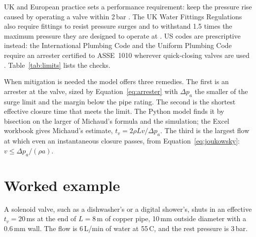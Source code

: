 \documentclass[a4paper,justified,nobib]{tufte-handout}
\newcommand{\degC}{\,\textdegree{}C}
\newcommand{\lpm}{\,L/min}
\begin{document}
UK and European practice sets a performance requirement: keep the pressure rise
caused by operating a valve within 2\,bar \citep{en806,din1988,vdi6006}. The UK
Water Fittings Regulations also require fittings to resist pressure surges and
to withstand 1.5 times the maximum pressure they are designed to operate at
\citep{wsr1999}. US codes are prescriptive instead: the International Plumbing
Code and the Uniform Plumbing Code require an arrester certified to ASSE~1010
wherever quick-closing valves are used \citep{ipc,upc,asse1010}.
Table~\ref{tab:limits} lists the checks.

When mitigation is needed the model offers three remedies. The first is an
arrester at the valve, sized by Equation~\ref{eq:arrester} with
$\Delta p_a$ the smaller of the surge limit and the margin below the pipe
rating. The second is the shortest effective closure time that meets the
limit. The Python model finds it by bisection on the larger of Michaud's
formula and the simulation; the Excel workbook gives Michaud's estimate,
$t_v=2\rho Lv/\Delta p_a$. The third is the largest flow at which even an
instantaneous closure passes, from Equation~\ref{eq:joukowsky}:
$v\le\Delta p_a/(\rho a)$.

\section{Worked example}

A solenoid valve, such as a dishwasher's or a digital shower's, shuts in an
effective $t_v=20$\,ms at the end of $L=8$\,m of copper pipe, 10\,mm outside
diameter with a 0.6\,mm wall. The flow is 6\lpm{} of water at 55\degC{}, and
the rest pressure is 3\,bar.
\end{document}
